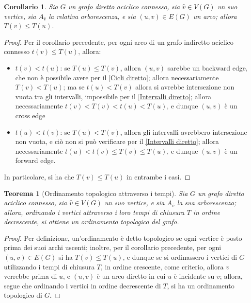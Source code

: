 \documentclass[14pt]{extreport}
\newtheorem{theorem}{Teorema}[subsection]
\newtheorem{corollary}{Corollario}[subsection]
\theoremstyle{definition}
\theoremstyle{definition}
\begin{document}
\begin{corollary}
    Sia $G$ un grafo diretto aciclico connesso, sia $\hat v \in V(G)$ un suo vertice, sia $A_{\hat v}$ la relativa arborescenza, e sia $(u, v) \in E(G)$ un arco; allora $T(v) \le T(u)$.
\end{corollary}

\begin{proof}
    Per il corollario precedente, per ogni arco di un grafo indiretto aciclico connesso $t(v) \le T(u)$, allora:
    \begin{itemize}
        \item $t(v) < t(u)$: se $T(u) \le T(v)$, allora $(u, v)$ sarebbe un backward edge, che non è possibile avere per il \cref{Cicli diretto}; allora necessariamente $T(v) < T(u)$; ma se $t(u) < T(v)$ allora si avrebbe intersezione non vuota tra gli intervalli, impossibile per il \cref{Intervalli diretto}; allora necessariamente $t(v) < T(v) < t(u) < T(u)$, e dunque $(u, v)$ è un cross edge
        \item $t(u) < t(v)$: se $T(u) < T(v)$, allora gli intervalli avrebbero intersezione non vuota, e ciò non si può verificare per il \cref{Intervalli diretto}; allora necessariamente $t(u) < t(v) \le T(v) \le T(u)$, e dunque $(u, v)$ è un forward edge.
    \end{itemize}

    In particolare, si ha che $T(v) \le T(u)$ in entrambe i casi.
\end{proof}

\begin{theorem}[Ordinamento topologico attraverso i tempi]
    Sia $G$ un grafo diretto aciclico connesso, sia $\hat v \in V(G)$ un suo vertice, e sia $A_{\hat v}$ la sua arborescenza; allora, ordinando i vertici attraverso i loro tempi di chiusura $T$ in ordine decrescente, si ottiene un ordinamento topologico del grafo.
\end{theorem}

\begin{proof}
    Per definizione, un'ordinamento è detto topologico se ogni vertice è posto prima dei suoi archi uscenti; inoltre, per il corollario precedente, per ogni $(u, v) \in E(G)$ si ha $T(v) \le T(u)$, e dunque se si ordinassero i vertici di $G$ utilizzando i tempi di chiusura $T$, in ordine crescente, come criterio, allora $v$ verrebbe prima di $u$, e $(u, v)$ è un arco diretto in cui $u$ è incidente su $v$; allora, segue che ordinando i vertici in ordine decrescente di $T$, si ha un ordinamento topologico di $G$.
\end{proof}
\end{document}
